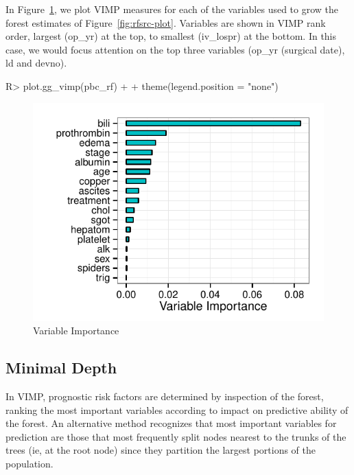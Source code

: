 \documentclass[nojss]{jss}\usepackage[]{graphicx}\usepackage[]{color}
\makeatletter
\def\maxwidth{ %
  \ifdim\Gin@nat@width>\linewidth
    \linewidth
  \else
    \Gin@nat@width
  \fi
}
\makeatother
\begin{document}
In Figure~\ref{fig:rf-vimp}, we plot VIMP measures for each of the variables used to grow the forest estimates of Figure~\ref{fig:rfsrc-plot}. Variables are shown in VIMP rank order, largest (op\_yr) at the top, to smallest (iv\_lospr) at the bottom. In this case, we would focus attention on the top three variables (op\_yr (surgical date), ld and devno).
\begin{Schunk}
\begin{Sinput}
R> plot.gg_vimp(pbc_rf) + 
+   theme(legend.position = "none")
\end{Sinput}
\begin{figure}[!htpb]

{\centering \includegraphics[width=\maxwidth]{figure/rfs-rf-vimp-1} 

}

\caption[Variable Importance]{Variable Importance\label{fig:rf-vimp}}
\end{figure}
\end{Schunk}

\subsection{Minimal Depth}\label{S:minimalDepth}
In VIMP, prognostic risk factors are determined by inspection of the forest, ranking the most important variables according to impact on predictive ability of the forest. An alternative method recognizes that most important variables for prediction are those that most frequently split nodes nearest to the trunks of the trees (ie, at the root node) since they partition the largest portions of the population. 
\end{document}
